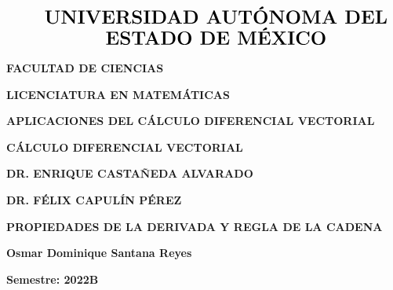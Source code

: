 \documentclass[fleqn]{article}
\begin{document}
    \begin{titlepage}
        
        \begin{figure}[t]
            $\begin{array}{c}
                \textnormal{\LARGE \textbf{UNIVERSIDAD AUTÓNOMA DEL}} \\
                \textnormal{\LARGE \textbf{ESTADO DE MÉXICO}}
            \end{array}$
        \end{figure}

        \centering
        {\LARGE \textbf{FACULTAD DE CIENCIAS}}

        \vspace{5mm}
        {\LARGE \textbf{LICENCIATURA EN MATEMÁTICAS}}

        \vspace{24mm}
        {\Large \textbf{APLICACIONES DEL CÁLCULO DIFERENCIAL VECTORIAL}}

        {\Large \textbf{CÁLCULO DIFERENCIAL VECTORIAL}}

        \vspace{7mm}
        {\Large \textbf{DR. ENRIQUE CASTAÑEDA ALVARADO}}

        {\Large \textbf{DR. FÉLIX CAPULÍN PÉREZ}}
        
        \vspace{24mm}
        {\Large \textbf{PROPIEDADES DE LA DERIVADA Y REGLA DE LA CADENA}}

        \vspace{30mm}
        {\Large \textbf{Osmar Dominique Santana Reyes}}

        \vspace{7mm}
        {\Large \textbf{Semestre: 2022B}}
        
        \vfill
    \end{titlepage}
\end{document}

